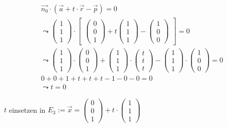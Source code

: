 \begin{gather}
\vec{n_0} \cdot (\vec{a}+t\cdot \vec{r}-\vec{p})=0\\
\leadsto 
\begin{pmatrix}
1\\1\\1
\end{pmatrix} \cdot 
\begin{bmatrix}
\begin{pmatrix}
0\\0\\1
\end{pmatrix}
+ t
\begin{pmatrix}
1\\1\\1
\end{pmatrix}
-
\begin{pmatrix}
1\\0\\0
\end{pmatrix}
\end{bmatrix} = 0\\
\leadsto
\begin{pmatrix}
1\\1\\1
\end{pmatrix}\cdot
\begin{pmatrix}
0\\0\\1
\end{pmatrix}
+
\begin{pmatrix}
1\\1\\1
\end{pmatrix}
\cdot
\begin{pmatrix}
t\\t\\t
\end{pmatrix}
-
\begin{pmatrix}
1\\1\\1
\end{pmatrix}
\cdot
\begin{pmatrix}
1\\0\\0
\end{pmatrix} =0\\
0+0+1+t+t+t-1-0-0=0\\
\leadsto t=0
\end{gather}

\ensuremath{t} einsetzen in \ensuremath{E_3:= \vec{x}=\begin{pmatrix}
		0\\0\\1
	\end{pmatrix} +t\cdot\begin{pmatrix}
		1\\1\\1
\end{pmatrix}}\\

